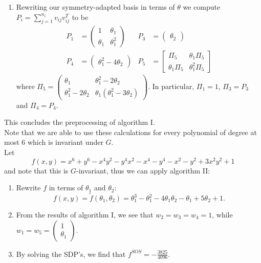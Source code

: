 \documentclass[]{article}
\begin{document}
\begin{enumerate}
    \item Rewriting our symmetry-adapted basis in terms of $\theta$ we compute $P_i=\sum_{j=1}^{n_i} v_{ij}v_{ij}^T$ to be
    \begin{align*}
        P_1&=\begin{pmatrix}1&\theta_1\\\theta_1&\theta_1^2\end{pmatrix}&
        P_3&=\begin{pmatrix}\theta_2\end{pmatrix}\\
        P_4&=\begin{pmatrix}\theta_1^2-4\theta_2\end{pmatrix}&
        P_5&=\begin{bmatrix}\Pi_5&\theta_1\Pi_5\\\theta_1\Pi_5&\theta_1^2\Pi_5\end{bmatrix}
    \end{align*}
    where $\Pi_5=\begin{pmatrix}\theta_1&\theta_1^2-2\theta_2\\\theta_1^2-2\theta_2&\theta_1(\theta_1^2-3\theta_2)\end{pmatrix}$. In particular, $\Pi_1=1$,  $\Pi_3=P_3$ and $\Pi_4=P_4$.\\
\end{enumerate}

This concludes the preprocessing of algorithm I.\\
Note that we are able to use these calculations for every polynomial of degree at most 6 which is invariant under $G$.\\


Let 
\[
    f(x,y)=x^6+y^6-x^4y^2-y^4x^2-x^4-y^4-x^2-y^2+3x^2y^2+1
\]
and note that this is $G$-invariant, thus we can apply algorithm II:
\begin{enumerate}
    \item Rewrite $f$ in terms of $\theta_1$ and $\theta_2$:
    \[
        f(x,y)=\tilde{f}(\theta_1,\theta_2)=\theta_1^3-\theta_1^2-4\theta_1\theta_2-\theta_1+5\theta_2+1.
    \]

    \item From the results of algorithm I, we see that $w_2=w_3=w_4=1$, while $w_1=w_5=\begin{pmatrix}1\\\theta_1\end{pmatrix}$.
    
    \item By solving the SDP's, we find that $f^{SOS}=-\frac{3825}{4096}$.
\end{enumerate}
\end{document}
